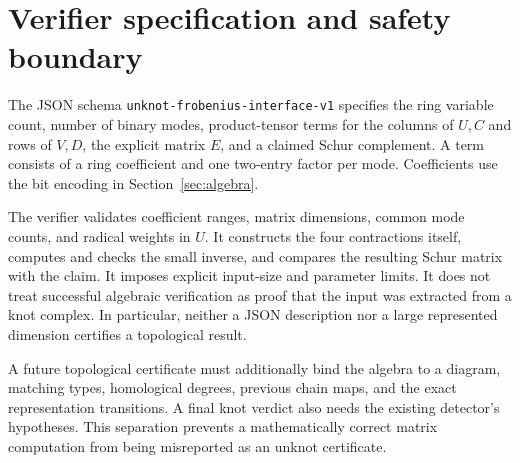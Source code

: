 \documentclass[11pt]{article}
\theoremstyle{definition}\newtheorem{definition}[theorem]{Definition}
\theoremstyle{remark}\newtheorem{remark}[theorem]{Remark}
\newcommand{\code}[1]{\texttt{#1}}
\begin{document}
\section{Verifier specification and safety boundary}
The JSON schema \code{unknot-frobenius-interface-v1} specifies the ring variable count, number of binary modes, product-tensor terms for the columns of $U,C$ and rows of $V,D$, the explicit matrix $E$, and a claimed Schur complement. A term consists of a ring coefficient and one two-entry factor per mode. Coefficients use the bit encoding in Section~\ref{sec:algebra}.

The verifier validates coefficient ranges, matrix dimensions, common mode counts, and radical weights in $U$. It constructs the four contractions itself, computes and checks the small inverse, and compares the resulting Schur matrix with the claim. It imposes explicit input-size and parameter limits. It does not treat successful algebraic verification as proof that the input was extracted from a knot complex. In particular, neither a JSON description nor a large represented dimension certifies a topological result.

A future topological certificate must additionally bind the algebra to a diagram, matching types, homological degrees, previous chain maps, and the exact representation transitions. A final knot verdict also needs the existing detector's hypotheses. This separation prevents a mathematically correct matrix computation from being misreported as an unknot certificate.
\end{document}
